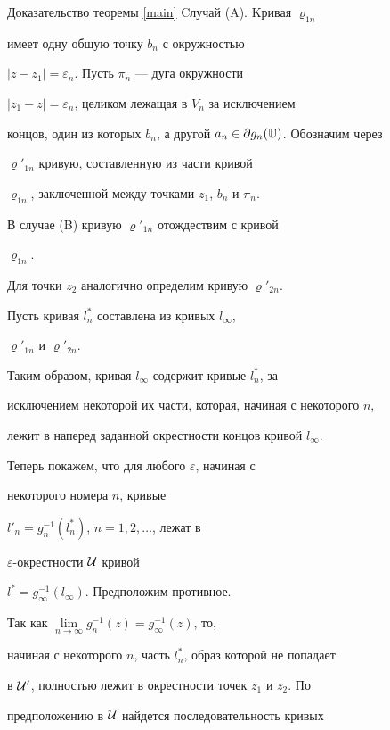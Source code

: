\begin{pf*}{Доказательство теоремы \ref{main}}
Cлучай (A). Kривая $\varrho_{1n}$


имеет одну общую точку $b_n$ с окружностью


$|z-z_1|=\varepsilon_n$. Пусть $\pi_{n}$ --- дуга окружности


$|z_1-z|=\varepsilon_n$, целиком лежащая в $V_n$ за исключением


концов, один из которых $b_n$, а другой $a_n\in\partial


g_n(\Bbb U)$. Обозначим через


$\varrho'_{1n}$ кривую, составленную из части кривой


$\varrho_{1n}$, заключенной между точками $z_1$, $b_n$ и $\pi_{n}$.





В случае (B) кривую $\varrho'_{1n}$ отождествим с кривой


$\varrho_{1n}$.


Для точки $z_2$ аналогично определим кривую $\varrho'_{2n}$.


Пусть кривая $l^*_n$ составлена из кривых $l_\infty$,


$\varrho'_{1n}$ и $\varrho'_{2n}$.


Таким образом, кривая $l_\infty$ содержит кривые $l_n^*$, за


исключением некоторой их части, которая, начиная с некоторого $n$,


лежит в наперед заданной окрестности концов кривой $l_\infty$.





Теперь покажем, что для любого $\varepsilon$, начиная с


некоторого номера $n$, кривые


$l'_n=g^{-1}_n(l^*_n)$, $n=1,2,\dotsc$, лежат в


$\varepsilon$-окрестности $\cal U$ кривой


$l^*=g^{-1}_\infty(l_\infty)$. Предположим противное.





Так как $\lim\limits_{n\to\infty}g^{-1}_n(z)=g^{-1}_\infty(z)$, то,


начиная с некоторого $n$, часть $l^*_n$, образ которой не попадает


в $\cal U'$, полностью лежит в окрестности точек $z_1$ и $z_2$. По


предположению в $\cal U$ найдется последовательность кривых



\end{pf*}
